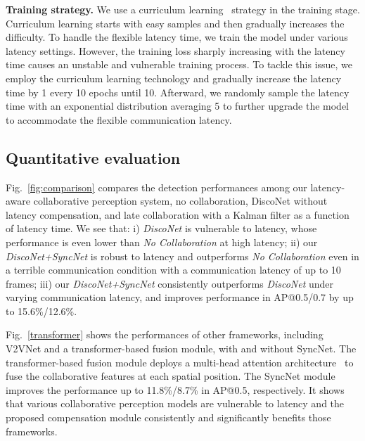 \documentclass[runningheads]{llncs}
\begin{document}
\textbf{Training strategy.} We use a curriculum learning~\cite{curriculum} strategy in the training stage. Curriculum learning starts with easy samples and then gradually increases the difficulty. To handle the flexible latency time, we train the model under various latency settings. However, the training loss sharply increasing with the latency time causes an unstable and vulnerable training process. To tackle this issue, we employ the curriculum learning technology and gradually increase the latency time by 1 every 10 epochs until 10. Afterward, we randomly sample the latency time with an exponential distribution averaging 5 to further upgrade the model to accommodate the flexible communication latency.

\subsection{Quantitative evaluation}


Fig.~\ref{fig:comparison} compares the detection performances among our latency-aware collaborative perception system, no collaboration, DiscoNet without latency compensation, and late collaboration with a Kalman filter as a function of latency time. We see that: i) \textit{DiscoNet} is vulnerable to latency, whose performance is even lower than \textit{No Collaboration} at high latency; ii) our \textit{DiscoNet+SyncNet} is robust to latency and outperforms \textit{No Collaboration} even in a terrible communication condition with a communication latency of up to 10 frames; iii) our \textit{DiscoNet+SyncNet} consistently outperforms \textit{DiscoNet} under varying communication latency, and improves performance in AP@0.5/0.7 by up to 15.6\%/12.6\%.

Fig.~\ref{transformer} shows the performances of other frameworks, including V2VNet and a transformer-based fusion module, with and without SyncNet. The transformer-based fusion module deploys a multi-head attention architecture~\cite{transformer} to fuse the collaborative features at each spatial position.  The SyncNet module improves the performance up to 11.8\%/8.7\% in AP@0.5, respectively. It shows that various collaborative perception models are vulnerable to latency and the proposed compensation module consistently and significantly benefits those frameworks.
\end{document}
